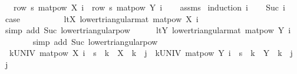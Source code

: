 \begin{isabellebody}
\ \ \ {\isachardoublequoteopen}row\ s{\isacharprime}{\kern0pt}\ {\isacharparenleft}{\kern0pt}matpow\ X\ i{\isacharparenright}{\kern0pt}\ {\isacharequal}{\kern0pt}\ row\ s{\isacharprime}{\kern0pt}\ {\isacharparenleft}{\kern0pt}matpow\ Y\ i{\isacharparenright}{\kern0pt}{\isachardoublequoteclose}\isanewline
%
\isadelimproof
\ \ %
\endisadelimproof
%
\isatagproof
{}\isamarkupfalse%
\ assms\isanewline
{}\isamarkupfalse%
\ {\isacharparenleft}{\kern0pt}induction\ i{\isacharparenright}{\kern0pt}\isanewline
\ \ \isamarkupfalse%
\ {\isacharparenleft}{\kern0pt}Suc\ i{\isacharparenright}{\kern0pt}\isanewline
\ \ \isamarkupfalse%
\ {\isacharquery}{\kern0pt}case\isanewline
\ \ \isamarkupfalse%
\ {\isacharminus}{\kern0pt}\isanewline
\ \ \ \ \isamarkupfalse%
\ ltX{\isacharcolon}{\kern0pt}\ {\isachardoublequoteopen}lower{\isacharunderscore}{\kern0pt}triangular{\isacharunderscore}{\kern0pt}mat\ {\isacharparenleft}{\kern0pt}matpow\ X\ i{\isacharparenright}{\kern0pt}{\isachardoublequoteclose}\isanewline
\ \ \ \ \ \ \isamarkupfalse%
\ {\isacharparenleft}{\kern0pt}simp\ add{\isacharcolon}{\kern0pt}\ Suc{\isacharparenleft}{\kern0pt}{}{\isacharparenright}{\kern0pt}\ lower{\isacharunderscore}{\kern0pt}triangular{\isacharunderscore}{\kern0pt}pow{\isacharparenright}{\kern0pt}\isanewline
\ \ \ \ \isamarkupfalse%
\ ltY{\isacharcolon}{\kern0pt}\ {\isachardoublequoteopen}lower{\isacharunderscore}{\kern0pt}triangular{\isacharunderscore}{\kern0pt}mat\ {\isacharparenleft}{\kern0pt}matpow\ Y\ i{\isacharparenright}{\kern0pt}{\isachardoublequoteclose}\isanewline
\ \ \ \ \ \ \isamarkupfalse%
\ {\isacharparenleft}{\kern0pt}simp\ add{\isacharcolon}{\kern0pt}\ Suc{\isacharparenleft}{\kern0pt}{}{\isacharparenright}{\kern0pt}\ lower{\isacharunderscore}{\kern0pt}triangular{\isacharunderscore}{\kern0pt}pow{\isacharparenright}{\kern0pt}\isanewline
\ \ \ \ \isamarkupfalse%
\ {\isachardoublequoteopen}\ {\isacharparenleft}{\kern0pt}{\isasymSum}k{\isasymin}UNIV{\isachardot}{\kern0pt}\ matpow\ X\ i\ {\isachardollar}{\kern0pt}\ s{\isacharprime}{\kern0pt}\ {\isachardollar}{\kern0pt}\ k\ {\isacharasterisk}{\kern0pt}\ X\ {\isachardollar}{\kern0pt}\ k\ {\isachardollar}{\kern0pt}\ j{\isacharparenright}{\kern0pt}\ {\isacharequal}{\kern0pt}\ {\isacharparenleft}{\kern0pt}{\isasymSum}k{\isasymin}UNIV{\isachardot}{\kern0pt}\ matpow\ Y\ i\ {\isachardollar}{\kern0pt}\ s{\isacharprime}{\kern0pt}\ {\isachardollar}{\kern0pt}\ k\ {\isacharasterisk}{\kern0pt}\ Y\ {\isachardollar}{\kern0pt}\ k\ {\isachardollar}{\kern0pt}\ j{\isacharparenright}{\kern0pt}{\isachardoublequoteclose}\ \ j\isanewline

\end{isabellebody}
